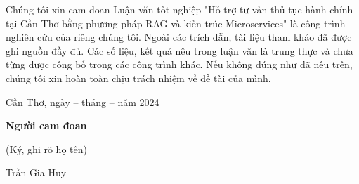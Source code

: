 Chúng tôi xin cam đoan Luận văn tốt nghiệp "Hỗ trợ tư vấn thủ tục hành chính tại Cần Thơ bằng phương pháp RAG và kiến trúc Microservices" \space là công trình nghiên cứu của riêng chúng tôi.
Ngoài các trích dẫn, tài liệu tham khảo đã được ghi nguồn đầy đủ.
Các số liệu, kết quả nêu trong luận văn là trung thực và chưa từng được công bố trong các công trình khác.
Nếu không đúng như đã nêu trên, chúng tôi xin hoàn toàn chịu trách nhiệm về đề tài của mình.

\begin{multicols}{2}
    \begin{minipage}{\linewidth}
    \end{minipage}

    \begin{minipage}{\linewidth}
        \centering
        Cần Thơ, ngày -- tháng -- năm 2024 %

        \textbf{Người cam đoan}

        (Ký, ghi rõ họ tên) \\

        \vspace{2.5cm}

        Trần Gia Huy
    \end{minipage}
\end{multicols}